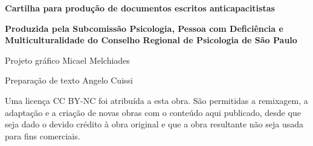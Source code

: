 \vspace{\fill}
\begin{CreditoInstitucional}
\begin{center}
\setasuspacing{\SingleSpacing}
\color{crp1}\footnotesize\textbf{Cartilha para produção de documentos escritos anticapacitistas}\vspace{0.2\baselineskip}

\color{black}\scriptsize\textbf{Produzida pela Subcomissão Psicologia, Pessoa com Deficiência e Multiculturalidade do Conselho Regional de Psicologia de São Paulo}

\fontebook\color{crp1}Projeto gráfico \color{black}Micael Melchiades
\vspace{-0.618\baselineskip}

\color{crp1}Preparação de texto \color{black}Angelo Cuissi
\vspace*{1.618\baselineskip}



\scriptsize Uma licença CC BY-NC foi atribuída a esta obra. São permitidas a remixagem,
a adaptação e a criação de novas obras com o conteúdo aqui publicado,
desde que seja dado o devido crédito à obra original e que a obra resultante
não seja usada para fins comerciais.
\end{center}
\end{CreditoInstitucional}
\vspace*{\fill}